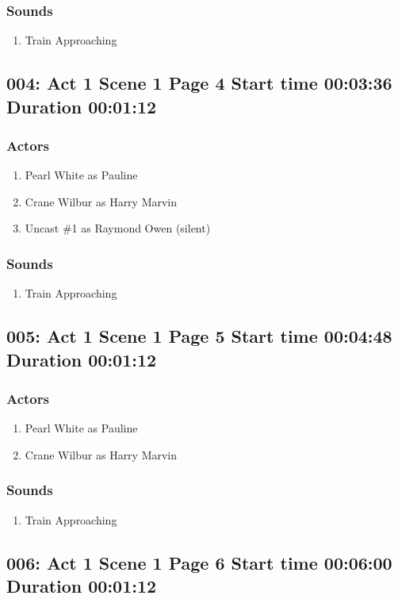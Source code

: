 \subsubsection{Sounds}
\begin{enumerate}
\item Train Approaching
\end{enumerate}
\subsection{004: Act 1 Scene 1 Page 4 Start time 00:03:36 Duration 00:01:12}

\subsubsection{Actors}
\begin{enumerate}
\item Pearl White as Pauline
\item Crane Wilbur as Harry Marvin
\item Uncast \#1 as Raymond Owen (silent)
\end{enumerate}

\subsubsection{Sounds}
\begin{enumerate}
\item Train Approaching
\end{enumerate}
\subsection{005: Act 1 Scene 1 Page 5 Start time 00:04:48 Duration 00:01:12}

\subsubsection{Actors}
\begin{enumerate}
\item Pearl White as Pauline
\item Crane Wilbur as Harry Marvin
\end{enumerate}

\subsubsection{Sounds}
\begin{enumerate}
\item Train Approaching
\end{enumerate}
\subsection{006: Act 1 Scene 1 Page 6 Start time 00:06:00 Duration 00:01:12}

